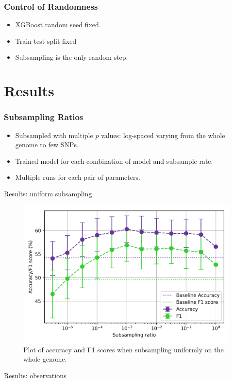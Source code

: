 \documentclass[aspectratio=169]{beamer}
\begin{document}
\begin{frame}
\frametitle{Control of Randomness}
\begin{itemize}
  \item XGBoost random seed fixed.
  \item Train-test split fixed
  \item Subsampling is the only random step.
\end{itemize}
\end{frame}

\section{Results}
\begin{frame}
\frametitle{Subsampling Ratios}
\begin{itemize}
    \item Subsampled with multiple $p$ values: log-spaced varying from the whole genome to few SNPs.
  \item Trained model for each combination of model and subsample rate.
  \item Multiple runs for each pair of parameters.
\end{itemize}
\end{frame}

\begin{frame}{Results: uniform subsampling}
\begin{figure}[H]
    \centering
    \includegraphics[height=0.5\textwidth]{../figures/subsample_plot.png}
    \caption{Plot of accuracy and F1 scores when subsampling uniformly on the whole genome.}
    \label{fig:res1a}
\end{figure}
\end{frame}

\begin{frame}{Results: observations}
\end{frame}
\end{document}
